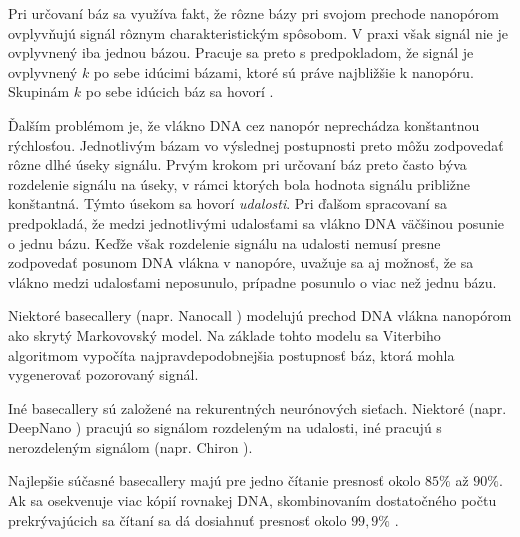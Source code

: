 Pri určovaní báz sa využíva fakt, že rôzne bázy pri svojom prechode nanopórom ovplyvňujú signál
rôznym charakteristickým spôsobom. V praxi však signál nie je ovplyvnený iba jednou bázou. Pracuje
sa preto s predpokladom, že signál je ovplyvnený $k$ po sebe idúcimi bázami, ktoré sú práve najbližšie
k nanopóru. Skupinám $k$ po sebe idúcich báz sa hovorí \emph{}.

Ďalším problémom je, že vlákno DNA cez nanopór neprechádza konštantnou rýchlosťou. Jednotlivým bázam vo 
výslednej postupnosti preto môžu zodpovedať rôzne dlhé úseky signálu. Prvým krokom pri určovaní báz 
preto často býva rozdelenie signálu na úseky, v rámci ktorých bola hodnota signálu približne konštantná.
Týmto úsekom sa hovorí \emph{udalosti}. Pri ďalšom spracovaní sa predpokladá, že medzi jednotlivými 
udalosťami sa vlákno DNA väčšinou posunie o jednu bázu. Keďže však rozdelenie signálu na udalosti nemusí
presne zodpovedať posunom DNA vlákna v nanopóre, uvažuje sa aj možnosť, že sa vlákno medzi udalosťami 
neposunulo, prípadne posunulo o viac než jednu bázu.


Niektoré basecallery (napr. Nanocall \cite{Nanocall2017}) modelujú prechod DNA vlákna nanopórom ako 
skrytý Markovovský model. Na základe tohto
modelu sa Viterbiho algoritmom vypočíta najpravdepodobnejšia postupnosť báz, ktorá mohla vygenerovať 
pozorovaný signál.

Iné basecallery sú založené na rekurentných neurónových sieťach. Niektoré (napr. DeepNano 
\cite{DeepNano2017}) pracujú so signálom rozdeleným na udalosti, iné pracujú s nerozdeleným signálom 
(napr. Chiron \cite{Chiron2017}).

Najlepšie súčasné basecallery majú pre jedno čítanie presnosť okolo $85\%$ až $90\%$. Ak sa osekvenuje viac kópií rovnakej DNA, skombinovaním dostatočného počtu prekrývajúcich sa čítaní sa dá dosiahnuť presnosť okolo $99,9\%$ \cite{BasecallerComparison}.
